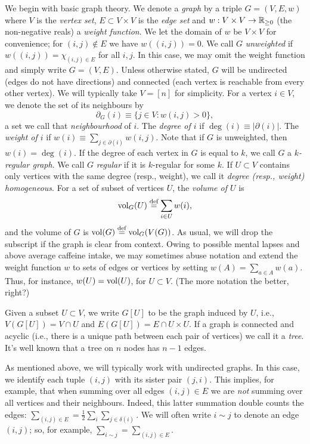 We begin with basic graph theory. 
We denote a \emph{graph} by a triple $G=(V,E,w)$ where $V$ is the \emph{vertex set}, $E\subset V\times V$ is the \emph{edge set} and $w:V\times V\to\mathbb{R}_{\geq0}$ (the non-negative reals) a \emph{weight function}. We let the domain of $w$ be $V\times V$ for convenience; for $(i,j)\notin E$ we have $w((i,j))=0$. We call $G$ \emph{unweighted} if $w((i,j))=\chi_{(i,j)\in E}$ for all $i,j$. In this case, we may omit the weight function and simply write $G=(V,E)$. 
Unless otherwise stated, $G$ will be undirected (edges do not have  directions) and connected (each vertex is reachable from every other vertex). 
We will typically take $V=[n]$ for simplicity. For a  vertex $i\in V$, we denote the set of its neighbours by 
\begin{equation}
\label{eq:delta(i)}
\partial_G(i) \equiv  \{j\in V:w(i,j)>0\},
\end{equation}
a set we call that \emph{neighbourhood} of $i$. The \emph{degree of $i$} if $\deg(i)\equiv |\partial(i)|$. The \emph{weight of $i$} if $w(i)\equiv \sum_{j\in \partial(i)}w(i,j)$. Note that if $G$ is unweighted, then $w(i)=\deg(i)$. If the degree of each vertex in $G$ is equal to $k$, we call $G$ a \emph{$k$-regular graph}. We call $G$ \emph{regular} if it is $k$-regular for some $k$. If $U\subset V$ contains only vertices with the same degree (resp., weight), we call it \emph{degree (resp., weight) homogeneous}. 
For a set of subset of vertices $U$, the \emph{volume of $U$} is 
\begin{equation}
\label{eq:volU}
\textnormal{vol}_G(U) \overset{\text{def}}{=} \sum_{i\in U}w(i),
\end{equation}
and the volume of $G$ is $\textnormal{vol}(G) \overset{\text{def}}{=} \textnormal{vol}_G(V(G))$. As usual, we will drop the subscript if the graph is clear from context. 
Owing to possible mental lapses and above average caffeine intake, we may sometimes abuse notation and extend the weight function $w$ to sets of edges or vertices by setting $w(A)=\sum_{a\in A}w(a)$. Thus, for instance, $w(U) = \textnormal{vol}(U)$, for $U\subset V$. (The more notation the better, right?) 

Given a subset $U\subset  V$, we write $G[U]$ to be the graph induced by $U$, i.e., $V(G[U])  = V\cap U$ and  $E(G[U]) = E \cap U \times U$. If a graph is connected  and acyclic (i.e., there is a unique path between each pair of vertices) we call it a \emph{tree}. It's well known that a tree on $n$ nodes has $n-1$ edges.  

As mentioned above, we will typically  work  with undirected graphs. In this case, we identify each tuple $(i,j)$ with its sister pair $(j,i)$. This implies, for example, that when summing over all edges $(i,j)\in E$ we are \emph{not} summing over all vertices and their neighbours. Indeed, this latter summation double counts the edges: $\sum_{(i,j)\in E}=\frac{1}{2}\sum_{i}\sum_{j\in\delta(i)}$. We will often write $i\sim j$ to denote an edge $(i,j)$; so, for example, $\sum_{i\sim j}=\sum_{(i,j)\in E}$. 

